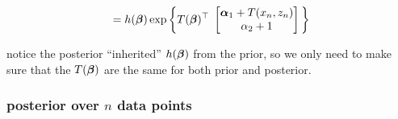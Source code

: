 \documentclass{article}
\begin{document}
\begin{itemize}
\begin{equation}
\begin{split}
&= h (\boldsymbol{\beta}) \exp \bigg\{ T(\boldsymbol{\beta})^\top \; \begin{bmatrix} \boldsymbol{\alpha}_1 +  T ( x_n, z_n)  \\ \alpha_2  + 1 \end{bmatrix}  \bigg\}  \\
\end{split}\end{equation}

notice the posterior ``inherited'' $h(\boldsymbol{\beta})$ from the prior, so we only need to make sure that the $T(\boldsymbol{\beta})$ are the same for both prior and posterior.

\end{itemize}


\subsubsection{posterior over $n$ data points}




\end{document}
